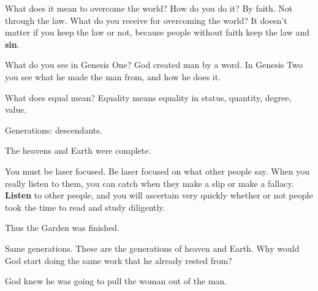 \documentclass[12pt]{article}
\begin{document}
	What does it mean to overcome the world? How do you do
	it? By faith. Not through the law. What do you receive for
	overcoming the world? It doesn't matter if you keep the 
	law or not, because people without faith keep the law and 
	\textbf{sin}.

	What do you see in Genesis One? God created man by a word. 
	In Genesis Two you see what he made the man from, and how
	he does it.

	What does equal mean? Equality means equality in status, 
	quantity, degree, value.

	\begin{quote}
		\BibleGenesisFiveOne{}
	\end{quote}

	Generations: descendants.

	\begin{quote}
		\BibleGenesisTwoOne{}
	\end{quote}

	The heavens and Earth were complete.

	\begin{quote}
		\BibleGenesisOneFour{}
		\BibleGenesisOneFive{}
		\BibleGenesisOneSix{}
	\end{quote}

	You must be laser focused. Be laser focused on what other people
	say. When you really listen to them, you can catch when they make
	a slip or make a fallacy. \textbf{Listen} to other people, and you
	will ascertain very quickly whether or not people took the time
	to read and study diligently.

	\begin{quote}
		\BibleGenesisOneSeven{}
		\BibleGenesisOneEight{}
		\BibleGenesisOneNine{}
		\BibleGenesisOneTen{}
	\end{quote}

	Thus the Garden was finished.

	\begin{quote}
		\BibleGenesisTwoTwo{}
		\BibleGenesisTwoThree{}
		\BibleGenesisTwoFour{}
	\end{quote}

	Same generations. These are the generations of heaven and Earth.
	Why would God start doing the same work that he already rested
	from?

	\begin{quote}
		\BibleGenesisOneTwentySeven{}
	\end{quote}

	God knew he was going to pull the woman out of the man.

	\begin{quote}
		\BibleRevelationTwoSeven{}
	\end{quote}
\end{document}

